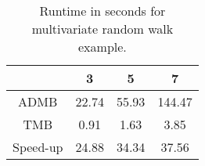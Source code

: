 \begin{table}[ht]
\centering
\begin{tabular}{cccc}
  \hline
 & 3 & 5 & 7 \\ 
  \hline
ADMB & 22.74 & 55.93 & 144.47 \\ 
  TMB & 0.91 & 1.63 & 3.85 \\ 
  Speed-up & 24.88 & 34.34 & 37.56 \\ 
   \hline
\end{tabular}
\caption{Runtime in seconds for multivariate random walk example.} 
\end{table}
